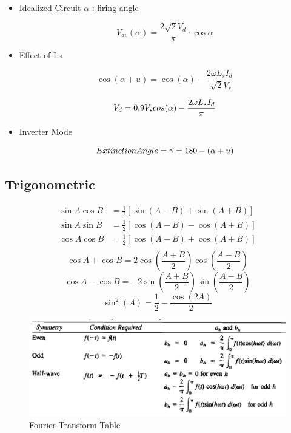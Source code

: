 \documentclass[twocolumn, ]{article}
\begin{document}
\begin{itemize}
\item {Idealized Circuit} $\alpha$ : firing angle

\begin{equation*}
	V_{av}(\alpha)=\frac{2 \sqrt{2} V_{d}}{\pi } \cdot \cos{\alpha}
\end{equation*}

\item {Effect of Ls}

\begin{equation*}
	\cos(\alpha + u)=\cos(\alpha)-\dfrac{2\omega L_{s} I_{d}}{\sqrt[]{2}V_{s}}
\end{equation*}

\begin{equation*}
	V_d = 0.9 V_s cos(\alpha) - \dfrac{2\omega L_s I_d}{\pi} \\
\end{equation*}

\item {Inverter Mode}

\begin{equation*}
	Extinction Angle = \\\gamma = 180 - (\alpha + u)\\
\end{equation*}


\end{itemize}


\subsection*{ \small Trigonometric }

\begin{align*}
          \sin A \cos B &= \frac{1}{2}\left[ \sin(A-B)+\sin(A+B) \right] \\
          \sin A \sin B &= \frac{1}{2}\left[ \cos(A-B)-\cos(A+B) \right] \\
          \cos A \cos B &= \frac{1}{2}\left[ \cos(A-B)+\cos(A+B) \right] \\     
\end{align*}  
\begin{equation*}
	  \cos A +\cos B = 2\cos(\frac{A+B}{2})\cos(\frac{A-B}{2})
\end{equation*}
\begin{equation*}
	  \cos A -\cos B = -2\sin(\frac{A+B}{2})\sin(\frac{A-B}{2})
\end{equation*}
\begin{equation*}
	\sin^2(A)=\frac{1}{2}-\frac{\cos(2A)}{2}
\end{equation*}
  \begin{figure}[!ht]
	\includegraphics[scale=0.45]{Fourier.png}
	\caption{Fourier Transform Table}
\end{figure}
\end{document}
